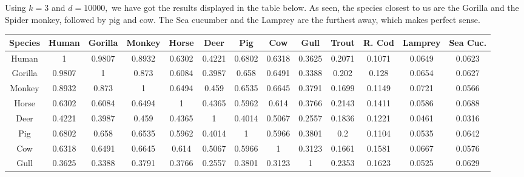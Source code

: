 \documentclass{tufte-handout}
\begin{document}
Using \begin{math} k = 3 \end{math} and \begin{math} d = 10000, \end{math} we have got the results displayed in the table below. As seen, the species closest to us are the Gorilla and the Spider monkey, followed by pig and cow. The Sea cucumber and the Lamprey are the furthest away, which makes perfect sense.
\\[1\baselineskip]

\medskip
\begin{adjustbox}{scale=0.8}

\begin{tabular}{c|c|c|c|c|c|c|c|c|c|c|c|c|}\toprule
Species & Human & Gorilla & Monkey & Horse & Deer & Pig & Cow & Gull & Trout & R. Cod & Lamprey & Sea Cuc.\\\midrule
Human &	\num{1}&	\num{0.9807}&	\num{0.8932}&	\num{0.6302}&	\num{0.4221}&	\num{0.6802}&	\num{0.6318}&	\num{0.3625}&	\num{0.2071}&	\num{0.1071}&	\num{0.0649}&	\num{0.0623}\\
Gorilla &	\num{0.9807}&	\num{1}&	\num{0.873}&	\num{0.6084}&	\num{0.3987}&	\num{0.658}&	\num{0.6491}&	\num{0.3388}&	\num{0.202}&	\num{0.128}&	\num{0.0654}&	\num{0.0627}\\
Monkey &	\num{0.8932}&	\num{0.873}&	\num{1}&	\num{0.6494}&	\num{0.459}&	\num{0.6535}&	\num{0.6645}&	\num{0.3791}&	\num{0.1699}&	\num{0.1149}&	\num{0.0721}&	\num{0.0566}\\
Horse &	\num{0.6302}&	\num{0.6084}&	\num{0.6494}&	\num{1}&	\num{0.4365}&	\num{0.5962}&	\num{0.614}&	\num{0.3766}&	\num{0.2143}&	\num{0.1411}&	\num{0.0586}&	\num{0.0688}\\
Deer &	\num{0.4221}&	\num{0.3987}&	\num{0.459}&	\num{0.4365}&	\num{1}&	\num{0.4014}&	\num{0.5067}&	\num{0.2557}&	\num{0.1836}&	\num{0.1221}&	\num{0.0461}&	\num{0.0316}\\
Pig &	\num{0.6802}&	\num{0.658}&	\num{0.6535}&	\num{0.5962}&	\num{0.4014}&	\num{1}&	\num{0.5966}&	\num{0.3801}&	\num{0.2}&	\num{0.1104}&	\num{0.0535}&	\num{0.0642}\\
Cow &	\num{0.6318}&	\num{0.6491}&	\num{0.6645}&	\num{0.614}&	\num{0.5067}&	\num{0.5966}&	\num{1}&	\num{0.3123}&	\num{0.1661}&	\num{0.1581}&	\num{0.0667}&	\num{0.0576}\\
Gull &	\num{0.3625}&	\num{0.3388}&	\num{0.3791}&	\num{0.3766}&	\num{0.2557}&	\num{0.3801}&	\num{0.3123}&	\num{1}&	\num{0.2353}&	\num{0.1623}&	\num{0.0525}&	\num{0.0629}\\

\end{tabular}
\end{adjustbox}
\end{document}
